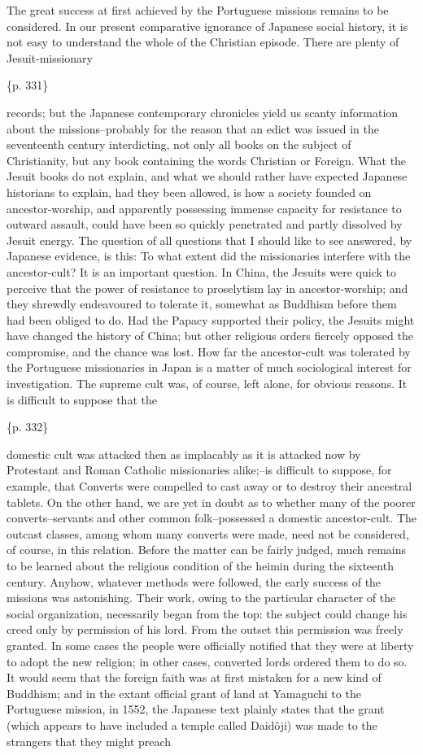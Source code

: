 The great success at first achieved by the Portuguese missions remains to be considered. In our present comparative ignorance of Japanese social history, it is not easy to understand the whole of the Christian episode. There are plenty of Jesuit-missionary

\{p. 331\}

records; but the Japanese contemporary chronicles yield us scanty information about the missions--probably for the reason that an edict was issued in the seventeenth century interdicting, not only all books on the subject of Christianity, but any book containing the words Christian or Foreign. What the Jesuit books do not explain, and what we should rather have expected Japanese historians to explain, had they been allowed, is how a society founded on ancestor-worship, and apparently possessing immense capacity for resistance to outward assault, could have been so quickly penetrated and partly dissolved by Jesuit energy. The question of all questions that I should like to see answered, by Japanese evidence, is this: To what extent did the missionaries interfere with the ancestor-cult? It is an important question. In China, the Jesuits were quick to perceive that the power of resistance to proselytism lay in ancestor-worship; and they shrewdly endeavoured to tolerate it, somewhat as Buddhism before them had been obliged to do. Had the Papacy supported their policy, the Jesuits might have changed the history of China; but other religious orders fiercely opposed the compromise, and the chance was lost. How far the ancestor-cult was tolerated by the Portuguese missionaries in Japan is a matter of much sociological interest for investigation. The supreme cult was, of course, left alone, for obvious reasons. It is difficult to suppose that the

\{p. 332\}

domestic cult was attacked then as implacably as it is attacked now by Protestant and Roman Catholic missionaries alike;--is difficult to suppose, for example, that Converts were compelled to cast away or to destroy their ancestral tablets. On the other hand, we are yet in doubt as to whether many of the poorer converts--servants and other common folk--possessed a domestic ancestor-cult. The outcast classes, among whom many converts were made, need not be considered, of course, in this relation. Before the matter can be fairly judged, much remains to be learned about the religious condition of the heimin during the sixteenth century. Anyhow, whatever methods were followed, the early success of the missions was astonishing. Their work, owing to the particular character of the social organization, necessarily began from the top: the subject could change his creed only by permission of his lord. From the outset this permission was freely granted. In some cases the people were officially notified that they were at liberty to adopt the new religion; in other cases, converted lords ordered them to do so. It would seem that the foreign faith was at first mistaken for a new kind of Buddhism; and in the extant official grant of land at Yamaguchi to the Portuguese mission, in 1552, the Japanese text plainly states that the grant (which appears to have included a temple called Daidôji) was made to the strangers that they might preach

